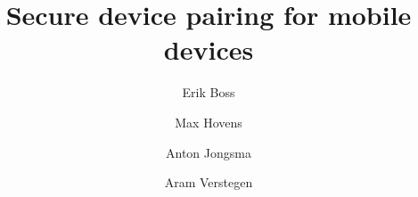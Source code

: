 \documentclass{beamer}
\title{Secure device pairing for mobile devices}
\author{Erik Boss \and Max Hovens \and Anton Jongsma \and Aram Verstegen}
\begin{document}
\begin{frame}
  \titlepage
\end{frame}
\end{document}
